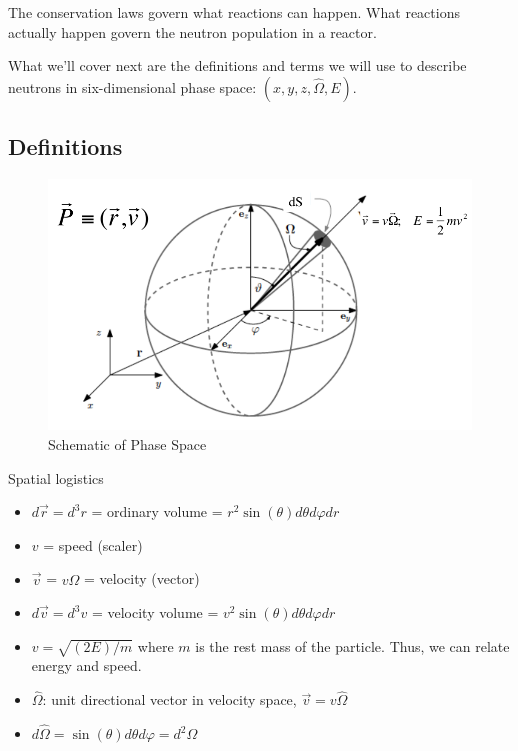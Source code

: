 \documentclass[12pt]{article}
\newcommand{\vOmega}{\ensuremath{\hat{\Omega}}}
\begin{document}
The conservation laws govern what reactions can happen. What reactions actually happen govern the neutron population in a reactor. 

What we'll cover next are the definitions and terms we will use to describe neutrons in six-dimensional phase space: $(x,y,z,\vOmega, E)$.

\subsection*{Definitions}

\begin{figure}[h!]
    \begin{center}
    \includegraphics[keepaspectratio, width = 4 in]{phase-space}
    \end{center}
    \caption{Schematic of Phase Space}
    \label{fig:phase_space}
\end{figure}

Spatial logistics
\begin{itemize}
\item $d\vec{r} = d^3r$ = ordinary volume = $r^2 \sin(\theta) d\theta d\varphi dr$
%
\item $v$ = speed (scaler)
\item $\vec{v}$ = $v\vOmega$ = velocity (vector)
\item $d\vec{v} = d^3v$ = velocity volume = $v^2 \sin(\theta)d\theta d\varphi dr$
\item $v = \sqrt{(2E)/m}$ where $m$ is the rest mass of the particle. Thus, we can relate energy and speed.

\item $\vOmega$: unit directional vector in velocity space, $\vec{v} = v\vOmega$
\item $d\vOmega = \sin(\theta)d\theta d\varphi =  d^2\Omega$
\end{itemize}
\end{document}
